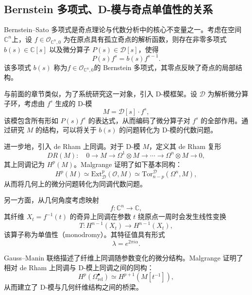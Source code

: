\subsection{Bernstein 多项式、D-模与奇点单值性的关系}
\cite{malgrange2006polynome}
Bernstein--Sato 多项式是奇点理论与代数分析中的核心不变量之一。考虑在空间$\mathbb{C}^n$上，设 $f \in \mathcal{O}_{\mathbb{C}^n,0}$ 为在原点具有孤立奇点的解析函数，则存在非零多项式 $b(s) \in \mathbb{C}[s]$ 以及微分算子 $P(s) \in \mathcal{D}[s]$，使得
\begin{equation*}
    P(s) f^s = b(s) f^{s-1}.
\end{equation*}
该多项式 $b(s)$ 称为$f \in \mathcal{O}_{\mathbb{C}^n,0}$的 Bernstein 多项式，其零点反映了奇点的局部结构。

与前面的章节类似，为了系统研究这一对象，引入 D-模框架。设 $\mathcal{D}$ 为解析微分算子环，考虑由 $f^s$ 生成的 D-模
\begin{equation*}
    M = \mathcal{D}[s]\cdot f^s,
\end{equation*}
该模包含所有形如 $P(s)f^s$ 的表达式，从而编码了微分算子对 $f^s$ 的全部作用。通过研究 $M$ 的结构，可以将关于 $b(s)$ 的问题转化为 D-模的代数问题。

进一步地，引入 de Rham 上同调。对于 D-模 $M$，定义其 de Rham 复形
\begin{equation}
    DR(M): \quad 0 \to M \to \Omega^1 \otimes M \to \cdots \to \Omega^n \otimes M \to 0,
\end{equation}
其上同调记为 $H^p(M)$。Malgrange 证明了如下基本同构：
\begin{equation*}
    H^p(M) \simeq \mathrm{Ext}^p_{\mathcal{D}}(\mathcal{O}, M) \simeq \mathrm{Tor}_{n-p}^{\mathcal{D}}(\Omega^n, M),
\end{equation*}
从而将几何上的微分问题转化为同调代数问题。


另一方面，从几何角度考虑映射
\[
    f: \mathbb{C}^n \to \mathbb{C},
\]
其纤维 $X_t = f^{-1}(t)$ 的奇异上同调在参数 $t$ 绕原点一周时会发生线性变换
\begin{equation}
    T: H^{n-1}(X_t) \to H^{n-1}(X_t),
\end{equation}
该算子称为单值性（monodromy）。其特征值具有形式
\begin{equation*}
    \lambda = e^{2\pi i \alpha}.
\end{equation*}





Gauss--Manin 联络描述了纤维上同调随参数变化的微分结构。Malgrange 证明了相对 de Rham 上同调与 D-模上同调之间的同构：
\begin{equation*}
    H^p(\Omega^\bullet_{\mathrm{rel}}) \simeq H^{p+1}(M[t^{-1}]),
\end{equation*}
从而建立了 D-模与几何纤维结构之间的桥梁。

